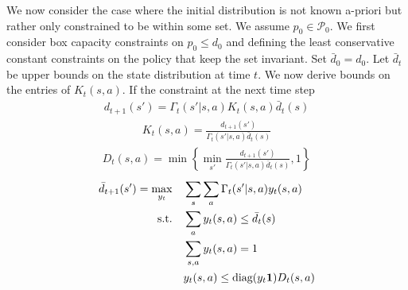 We now consider the case where the initial distribution is not known a-priori but rather only constrained to be within some set.  We assume $p_0 \in \mathcal{P}_0$.  We first consider box capacity constraints on $p_0 \leq d_0$ and defining the least conservative constant constraints on the policy that keep the set invariant.  Set $\bar{d}_0 = d_0$. Let $\bar{d}_t$ be upper bounds on the state distribution at time $t$.  We now derive bounds on the entries of $K_t(s,a)$.  If the constraint at the next time step 
\begin{align}
d_{t+1}(s')= \Gamma_t(s'|s,a)K_t(s,a)\bar{d}_t(s)
\end{align}
\begin{align}
K_t(s,a) = 
\frac{d_{t+1}(s')}{\Gamma_t(s'|s,a)\bar{d}_t(s)}
\end{align}
\begin{align}
D_t(s,a) = \min \left\{\min_{s'}
\frac{d_{t+1}(s')}{\Gamma_t(s'|s,a)\bar{d}_t(s)},1
\right\}
\end{align}
\begin{align}
\bar{d}_{t+1}(s') = \max_{y_t} & \quad \sum_s \sum_a \Gamma_t(s'|s,a)y_t(s,a) \\ 
\text{s.t.}& \quad \sum_a y_t(s,a) \leq \bar{d}_t(s) \notag \\
& \quad \sum_{s,a} y_t(s,a) = 1 \notag \\
& \quad y_t(s,a) \leq \text{diag}(y_t\mathbf{1})D_t(s,a) \notag
\end{align}